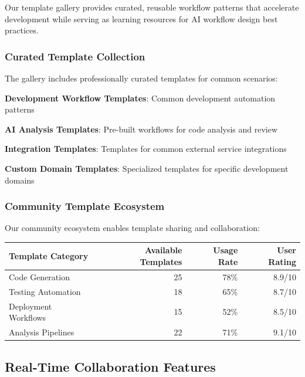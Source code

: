 Our template gallery provides curated, reusable workflow patterns that accelerate development while serving as learning resources for AI workflow design best practices.

\subsubsection*{Curated Template Collection}

The gallery includes professionally curated templates for common scenarios:

\begin{expandedlist}
    \item \textbf{Development Workflow Templates}: Common development automation patterns
    \item \textbf{AI Analysis Templates}: Pre-built workflows for code analysis and review
    \item \textbf{Integration Templates}: Templates for common external service integrations
    \item \textbf{Custom Domain Templates}: Specialized templates for specific development domains
\end{expandedlist}

\subsubsection*{Community Template Ecosystem}

Our community ecosystem enables template sharing and collaboration:

\begin{center}
\begin{tabular}{@{}lrrr@{}}
\toprule
\textbf{Template Category} & \textbf{Available Templates} & \textbf{Usage Rate} & \textbf{User Rating} \\
\midrule
Code Generation & 25 & 78\% & 8.9/10 \\
Testing Automation & 18 & 65\% & 8.7/10 \\
Deployment Workflows & 15 & 52\% & 8.5/10 \\
Analysis Pipelines & 22 & 71\% & 9.1/10 \\
\bottomrule
\end{tabular}
\end{center}

\subsection*{Real-Time Collaboration Features}

